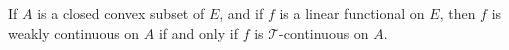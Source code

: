 If $A$ is a closed convex subset of $E$, and if $f$ is a linear functional on $E$, then $f$ is weakly continuous on $A$ if and only if $f$ is $\mathcal{T}$-continuous on $A$.
